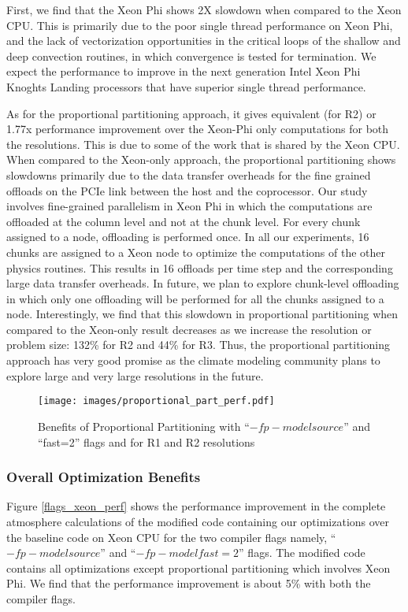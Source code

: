 First, we find that the Xeon Phi shows 2X slowdown when compared to the Xeon CPU. This is primarily due to the poor single thread performance on Xeon Phi, and the lack of vectorization opportunities in the critical loops of the shallow and deep convection routines, in which convergence is tested for termination. We expect the performance to improve in the next generation Intel Xeon Phi Knoghts Landing processors that have superior single thread performance.

As for the proportional partitioning approach, it gives equivalent (for R2) or 1.77x performance improvement over the Xeon-Phi only computations for both the resolutions. This is due to some of the work that is shared by the Xeon CPU. When compared to the Xeon-only approach, the proportional partitioning shows slowdowns primarily due to the data transfer overheads for the fine grained offloads on the PCIe link between the host and the coprocessor. Our study involves fine-grained parallelism in Xeon Phi in which the computations are offloaded at the column level and not at the chunk level. For every chunk assigned to a node, offloading is performed once. In all our experiments, 16 chunks are assigned to a Xeon node to optimize the computations of the other physics routines. This results in 16 offloads per time step and the corresponding large data transfer overheads. In future, we plan to explore chunk-level offloading in which only one offloading will be performed for all the chunks assigned to a node. Interestingly, we find that this slowdown in proportional partitioning when compared to the Xeon-only result decreases as we increase the resolution or problem size: 132\% for R2 and 44\% for R3. Thus, the proportional partitioning approach has very good promise as the climate modeling community plans to explore large and very large resolutions in the future.

\begin {figure}
\centering
\texttt{[image: images/proportional\_part\_perf.pdf]}
\caption{Benefits of Proportional Partitioning with ``$-fp-model source$'' and ``fast=2'' flags and for R1 and R2 resolutions}
\label{proportional_part_perf}
\end{figure}

\subsubsection{Overall Optimization Benefits}

Figure \ref{flags_xeon_perf} shows the performance improvement in the complete atmosphere calculations of the modified code containing our optimizations over the baseline code on Xeon CPU for the two compiler flags namely, ``$-fp-model source$'' and ``$-fp-model fast=2$'' flags. The modified code contains all optimizations except proportional partitioning which involves Xeon Phi. We find that the performance improvement is about 5\% with both the compiler flags.

